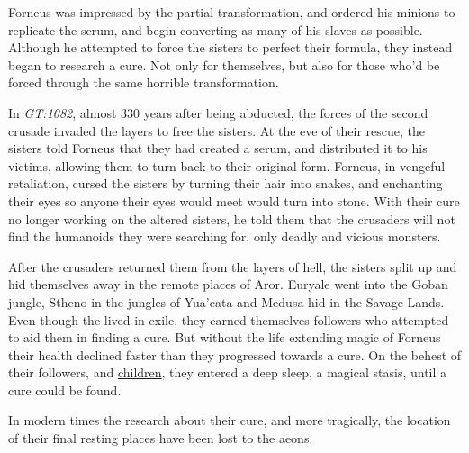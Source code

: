 Forneus was impressed by the partial transformation, and ordered his minions to
replicate the serum, and begin converting as many of his slaves as possible.
Although he attempted to force the sisters to perfect their formula, they
instead began to research a cure. Not only for themselves, but also for those
who'd be forced through the same horrible transformation.

In \emph{GT:1082}, almost 330 years after being abducted, the forces of the
second crusade invaded the layers to free the sisters. At the eve of their
rescue, the sisters told Forneus that they had created a serum, and distributed
it to his victims, allowing them to turn back to their original form. Forneus,
in vengeful retaliation, cursed the sisters by turning their hair into snakes,
and enchanting their eyes so anyone their eyes would meet would turn into
stone. With their cure no longer working on the altered sisters, he told them
that the crusaders will not find the humanoids they were searching for, only
deadly and vicious monsters.

After the crusaders returned them from the layers of hell, the sisters split
up and hid themselves away in the remote places of Aror. Euryale went into the
Goban jungle, Stheno in the jungles of Yua'cata and Medusa hid in the Savage
Lands. Even though the lived in exile, they earned themselves followers who
attempted to aid them in finding a cure. But without the life extending magic
of Forneus their health declined faster than they progressed towards a
cure. On the behest of their followers, and \hyperref[sec:Medusa]{children},
they entered a deep sleep, a magical stasis, until a cure could be found.

In modern times the research about their cure, and more tragically, the location
of their final resting places have been lost to the aeons.


